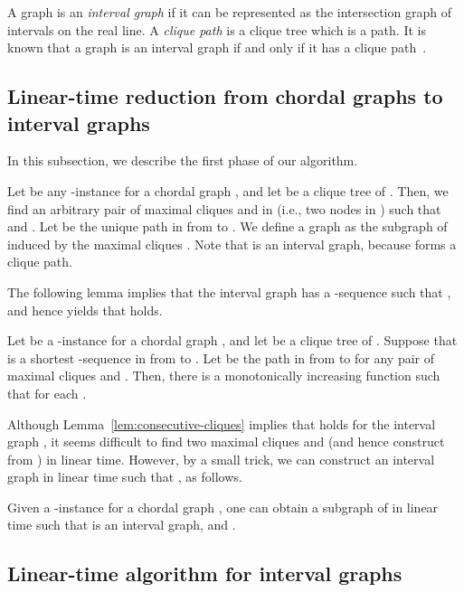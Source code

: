 \documentclass{llncs}
\newcounter{one}
\newcounter{two}
\begin{document}
	A graph is an \emph{interval graph} if it can be represented as the intersection graph of intervals on the real line.
	A \emph{clique path} is a clique tree which is a path.
	It is known that a graph is an interval graph if and only if it has a clique path~\cite{FulkersonG65,GilmoreH64}.







\subsection{Linear-time reduction from chordal graphs to interval graphs}

	In this subsection, we describe the first phase of our algorithm. 

	Let  be any -instance for a chordal graph , and let  be a clique tree of .
	Then, we find an arbitrary pair of maximal cliques  and  in  (i.e., two nodes in ) such that  and .
	Let  be the unique path in  from  to . 
	We define a graph  as the subgraph of  induced by the maximal cliques .
	Note that  is an interval graph, because  forms a clique path. 






	The following lemma implies that the interval graph  has a -sequence  such that , and hence yields that  holds. 
	\begin{lemma} \label{lem:consecutive-cliques}
	Let  be a -instance for a chordal graph , and let  be a clique tree of .
	Suppose that  is a shortest -sequence in  from  to .
Let  be the path in  from  to  for any pair of maximal cliques  and .
	Then, there is a monotonically increasing function  such that  for each .
\end{lemma}

	Although Lemma~\ref{lem:consecutive-cliques} implies that  holds for the interval graph , it seems difficult to find two maximal cliques  and  (and hence construct  from ) in linear time. 
	However, by a small trick, we can construct an interval graph  in linear time such that , as follows.
	\begin{lemma} \label{lem:chordal->interval}
	Given a -instance  for a chordal graph , one can obtain a subgraph  of  in linear time such that  is an interval graph,  and .
	\end{lemma}


\subsection{Linear-time algorithm for interval graphs} \label{subsec:interval}
\end{document}
